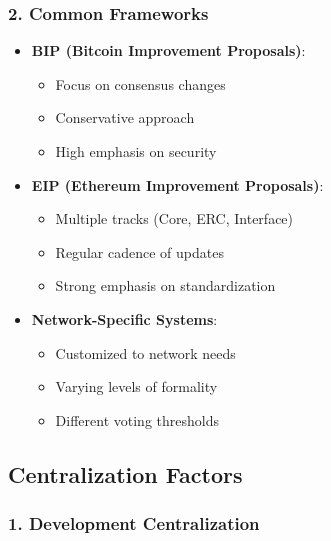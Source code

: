 \documentclass[
  letterpaper,
  DIV=11,
  numbers=noendperiod]{scrreprt}
\providecommand{\tightlist}{%
  \setlength{\itemsep}{0pt}\setlength{\parskip}{0pt}}\usepackage{longtable,booktabs,array}
\begin{document}
\subsubsection{2. Common Frameworks}\label{common-frameworks}

\begin{itemize}
\tightlist
\item
  \textbf{BIP (Bitcoin Improvement Proposals)}:

  \begin{itemize}
  \tightlist
  \item
    Focus on consensus changes
  \item
    Conservative approach
  \item
    High emphasis on security
  \end{itemize}
\item
  \textbf{EIP (Ethereum Improvement Proposals)}:

  \begin{itemize}
  \tightlist
  \item
    Multiple tracks (Core, ERC, Interface)
  \item
    Regular cadence of updates
  \item
    Strong emphasis on standardization
  \end{itemize}
\item
  \textbf{Network-Specific Systems}:

  \begin{itemize}
  \tightlist
  \item
    Customized to network needs
  \item
    Varying levels of formality
  \item
    Different voting thresholds
  \end{itemize}
\end{itemize}

\subsection{Centralization Factors}\label{centralization-factors}

\subsubsection{1. Development
Centralization}\label{development-centralization}
\end{document}
